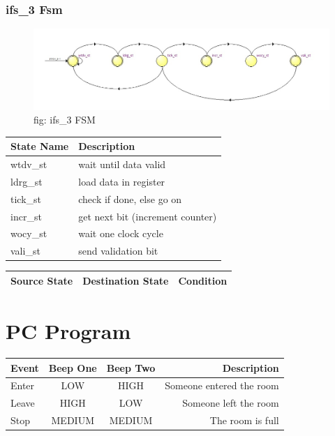 \documentclass[12pt,a4 paper] {report}
\begin{document}
\subsection{ifs\_3 Fsm}
\begin{figure}[h]
	\centering	
	\includegraphics[scale=0.4]{../png/ifs_3.png}
	\newline
	fig: ifs\_3 FSM\\
\end{figure}
\begin{center}
 \begin{tabular}{| p{4cm} | p{7cm} |}
	 \hline
	 \textbf{State Name} & \textbf{Description} \\
	 \hline
	 wtdv\_st & wait until data valid \\
	 \hline
	 ldrg\_st & load data in register \\
	 \hline
	 tick\_st & check if done, else go on \\
	 \hline
	 incr\_st & get next bit (increment counter) \\
	 \hline
	 wocy\_st & wait one clock cycle \\
	 \hline
	 vali\_st & send validation bit \\
	 \hline
 \end{tabular}
\end{center}
\begin{center}
	\begin{tabular}{| p{2cm} | p{2cm} | p{11cm} |}
		\hline
		Source State& Destination State & Condition \\
		\hline	
		
		
	\end{tabular}	
\end{center}

\newpage

\chapter{PC Program}

\begin{center}
	\begin{tabular}{|l|c|c|r|}
		\hline
		\textbf{Event} & \textbf{Beep One} & \textbf{Beep Two} & \textbf{Description} \\
		\hline
		Enter & LOW & HIGH & Someone entered the room \\
		\hline
		Leave & HIGH & LOW & Someone left the room \\
		\hline
		Stop & MEDIUM & MEDIUM & The room is full \\
		\hline
	\end{tabular}
\end{center}
\end{document}

